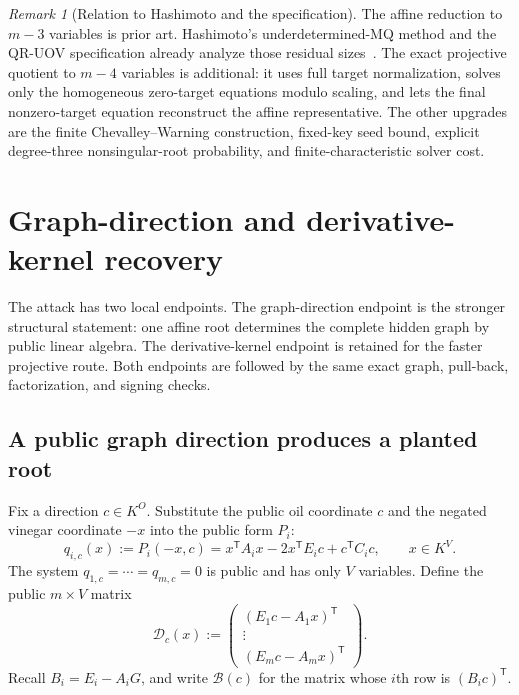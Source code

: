 \documentclass[11pt,a4paper]{article}
\theoremstyle{definition}
\theoremstyle{remark}
\newtheorem{remark}[theorem]{Remark}
\begin{document}
\begin{remark}[Relation to Hashimoto and the specification]\label{rem:direct-prior-art}
The affine reduction to $m-3$ variables is prior art.  Hashimoto's
underdetermined-MQ method and the QR-UOV specification already analyze those
residual sizes~\cite{Hashimoto2023,QRUOVSpec}.  The exact projective quotient
to $m-4$ variables is additional: it uses full target normalization, solves
only the homogeneous zero-target equations modulo scaling, and lets the final
nonzero-target equation reconstruct the affine representative.  The other
upgrades are the finite Chevalley--Warning construction, fixed-key seed bound,
explicit degree-three nonsingular-root probability, and finite-characteristic
solver cost.
\end{remark}

\section{Graph-direction and derivative-kernel recovery}\label{sec:recovery}

The attack has two local endpoints.  The graph-direction endpoint is the stronger structural statement: one affine root determines the complete hidden graph by public linear algebra.  The derivative-kernel endpoint is retained for the faster projective route.  Both endpoints are followed by the same exact graph, pull-back, factorization, and signing checks.

\subsection{A public graph direction produces a planted root}

Fix a direction $c\in K^O$.  Substitute the public oil coordinate $c$ and the negated vinegar coordinate $-x$ into the public form $P_i$:
\begin{equation}\label{eq:direction-system}
 q_{i,c}(x):=P_i(-x,c)
 =x^{\mathsf T}A_ix-2x^{\mathsf T}E_ic+c^{\mathsf T}C_ic,
 \qquad x\in K^V.
\end{equation}
The system $q_{1,c}=\cdots=q_{m,c}=0$ is public and has only $V$ variables.  Define the public $m\times V$ matrix
\begin{equation}\label{eq:direction-matrix}
 \mathcal D_c(x):=
 \begin{pmatrix}
 (E_1c-A_1x)^{\mathsf T}\\[-1mm]
 \vdots\\[-1mm]
 (E_mc-A_mx)^{\mathsf T}
 \end{pmatrix}.
\end{equation}
Recall $B_i=E_i-A_iG$, and write $\mathcal B(c)$ for the matrix whose $i$th row is $(B_ic)^{\mathsf T}$.
\end{document}

